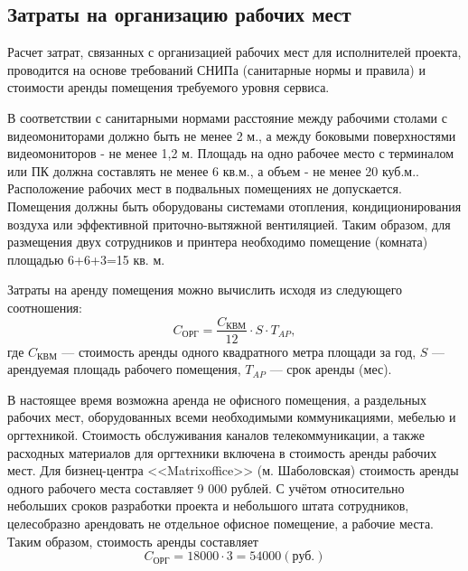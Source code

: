 \subsection{Затраты на организацию рабочих мест} \label{office_costs}

Расчет затрат, связанных с организацией рабочих мест для исполнителей проекта, проводится на основе требований СНИПа (санитарные нормы и правила) и стоимости аренды помещения требуемого уровня сервиса.

\vspace{\baselineskip}
В соответствии с санитарными нормами расстояние между рабочими столами с видеомониторами должно быть не менее 2 м., а между боковыми поверхностями видеомониторов - не менее 1,2 м. Площадь на одно рабочее место с терминалом или ПК должна составлять не менее 6 кв.м., а объем - не менее 20 куб.м.. Расположение рабочих мест в подвальных помещениях не допускается. Помещения должны быть оборудованы системами отопления, кондиционирования воздуха или эффективной приточно-вытяжной вентиляцией. Таким образом, для размещения двух сотрудников и принтера необходимо помещение (комната) площадью 6+6+3=15 кв. м.

\vspace{\baselineskip}
Затраты на аренду помещения можно вычислить исходя из следующего соотношения:
\begin{equation}
  \label{eq:office_cost_formula}
C_\textrm{ОРГ} = \frac {C_\textrm{КВМ}} {12} \cdot S \cdot T_{AP},
\end{equation}
где $C_\textrm{КВМ}$ --- стоимость аренды одного квадратного метра площади за год, $S$ --- арендуемая площадь рабочего помещения, $T_{AP}$ --- срок аренды (мес).

\vspace{\baselineskip}
В настоящее время возможна аренда не офисного помещения, а раздельных рабочих мест, оборудованных всеми необходимыми коммуникациями, мебелью и оргтехникой. Стоимость обслуживания каналов телекоммуникации, а также расходных материалов для оргтехники включена в стоимость аренды рабочих мест. Для бизнец-центра <<Matrixoffice>> (м. Шаболовская) стоимость аренды одного рабочего места составляет 9 000 рублей. С учётом относительно небольших сроков разработки проекта и небольшого штата сотрудников, целесобразно арендовать не отдельное офисное помещение, а рабочие места.
Таким образом, стоимость аренды составляет
\begin{equation}
  \label{eq:office_cost}
C_\textrm{ОРГ} = 18 000 \cdot 3 = 54000 (\textrm{руб.})
\end{equation}
